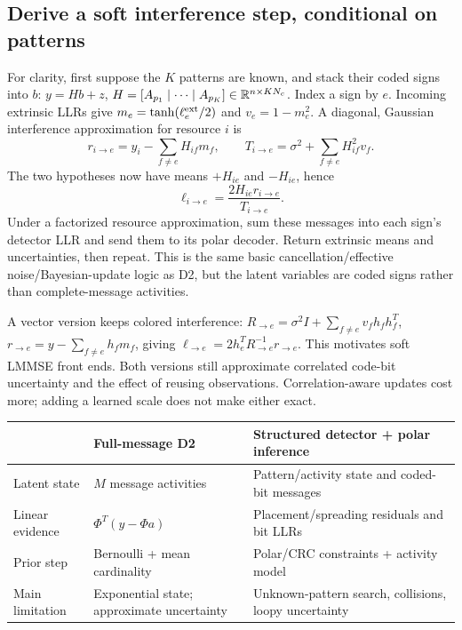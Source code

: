 \documentclass[10pt,a4paper]{article}
\begin{document}
\subsection{Derive a soft interference step, conditional on patterns}
For clarity, first suppose the $K$ patterns are known, and stack their coded signs into $b$:
$y=H b+z$, $H=[A_{p_1}\mid\cdots\mid A_{p_K}]\in\mathbb{R}^{n\times KN_c}$.
Index a sign by $e$. Incoming extrinsic LLRs give $m_e=\tanh(\ell_e^{\rm ext}/2)$ and $v_e=1-m_e^2$.
A diagonal, Gaussian interference approximation for resource $i$ is
\begin{equation}
 r_{i\to e}=y_i-\sum_{f\ne e}H_{if}m_f,\qquad
 T_{i\to e}=\sigma^2+\sum_{f\ne e}H_{if}^2v_f.
\end{equation}
The two hypotheses now have means $+H_{ie}$ and $-H_{ie}$, hence
\begin{equation}
 \boxed{\ell_{i\to e}=\frac{2H_{ie}r_{i\to e}}{T_{i\to e}}}.
 \label{eq:softic}
\end{equation}
Under a factorized resource approximation, sum these messages into each sign's detector LLR and send them to its
polar decoder. Return extrinsic means and uncertainties, then repeat. This is the same basic cancellation/effective
noise/Bayesian-update logic as D2, but the latent variables are coded signs rather than complete-message activities.

A vector version keeps colored interference: $R_{\to e}=\sigma^2I+\sum_{f\ne e}v_fh_fh_f^T$,
$r_{\to e}=y-\sum_{f\ne e}h_fm_f$, giving $\ell_{\to e}=2h_e^TR_{\to e}^{-1}r_{\to e}$.
This motivates soft LMMSE front ends. Both versions still approximate correlated code-bit uncertainty and the effect
of reusing observations. Correlation-aware updates cost more; adding a learned scale does not make either exact.

\begin{center}
\begin{tabularx}{\textwidth}{@{}lYY@{}}\toprule
 & Full-message D2 & Structured detector + polar inference\\\midrule
Latent state & $M$ message activities & Pattern/activity state and coded-bit messages\\
Linear evidence & $\Phi^T(y-\Phi a)$ & Placement/spreading residuals and bit LLRs\\
Prior step & Bernoulli + mean cardinality & Polar/CRC constraints + activity model\\
Main limitation & Exponential state; approximate uncertainty & Unknown-pattern search, collisions, loopy uncertainty\\\bottomrule
\end{tabularx}
\end{center}
\end{document}
